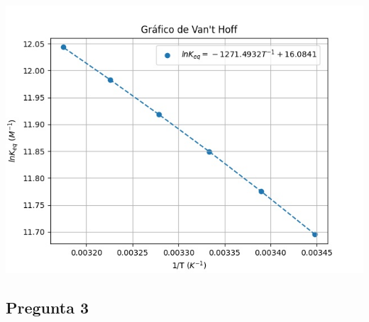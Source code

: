 \documentclass{article}
\begin{document}
    \begin{center}
        \includegraphics[scale=0.5]{g2.jpeg}
    \end{center}

    \subsection*{Pregunta 3}
\end{document}
